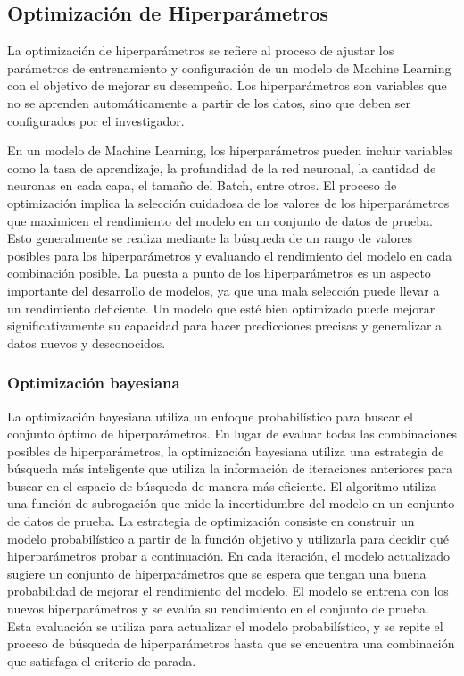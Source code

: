 \subsection{Optimización de Hiperparámetros}
La optimización de hiperparámetros\cite{hypertune} se refiere al proceso de ajustar los parámetros 
de entrenamiento y configuración de un modelo de Machine Learning con el objetivo de 
mejorar su desempeño. Los hiperparámetros son variables que no se aprenden automáticamente 
a partir de los datos, sino que deben ser configurados por el investigador.\medskip

En un modelo de Machine Learning, los hiperparámetros pueden incluir variables como 
la tasa de aprendizaje, la profundidad de la red neuronal, la cantidad de neuronas en 
cada capa, el tamaño del Batch, entre otros. El proceso de optimización implica la 
selección cuidadosa de los valores de los hiperparámetros que maximicen el rendimiento 
del modelo en un conjunto de datos de prueba. Esto generalmente se realiza mediante 
la búsqueda de un rango de valores posibles para los hiperparámetros y evaluando el 
rendimiento del modelo en cada combinación posible. La puesta a punto de los hiperparámetros 
es un aspecto importante del desarrollo de modelos, ya que una mala selección puede llevar a un rendimiento 
deficiente. Un modelo que esté bien optimizado puede mejorar significativamente su 
capacidad para hacer predicciones precisas y generalizar a datos nuevos y desconocidos.

\subsubsection{Optimización bayesiana}
La optimización bayesiana\cite{bayesianoptmization} utiliza un enfoque probabilístico para buscar el conjunto 
óptimo de hiperparámetros. En lugar de evaluar todas las combinaciones posibles de 
hiperparámetros, la optimización bayesiana utiliza una estrategia de búsqueda más 
inteligente que utiliza la información de iteraciones anteriores para buscar en el 
espacio de búsqueda de manera más eficiente. El algoritmo utiliza una función de subrogación que mide la incertidumbre del modelo 
en un conjunto de datos de prueba. La estrategia de optimización consiste en construir 
un modelo probabilístico a partir de la función objetivo y utilizarla para decidir qué hiperparámetros 
probar a continuación. En cada iteración, el modelo actualizado sugiere un conjunto de 
hiperparámetros que se espera que tengan una buena probabilidad de mejorar el rendimiento 
del modelo. El modelo se entrena con los nuevos hiperparámetros y se evalúa 
su rendimiento en el conjunto de prueba. Esta evaluación se utiliza para actualizar el 
modelo probabilístico, y se repite el proceso de búsqueda de hiperparámetros hasta 
que se encuentra una combinación que satisfaga el criterio de parada.

